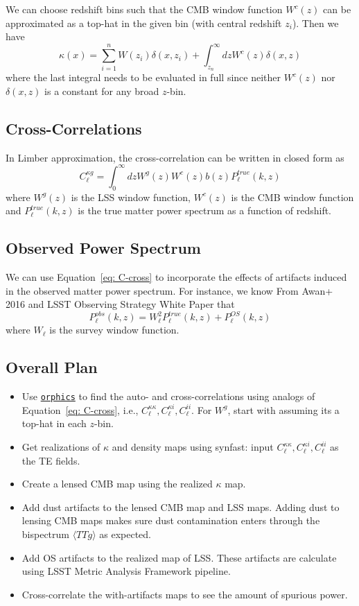 \documentclass{article}
\newcommand{\eq}[1]{\begin{equation}{#1}\end{equation}}
\begin{document}
{We can choose redshift bins such that the CMB window function $W^c(z)$ can be approximated as a top-hat in the given bin (with central redshift $z_i$). Then we have
\eq{\kappa(x)= \sum_{i=1}^n W(z_i)\delta(x,z_i) +  \int_{z_n}^\infty dz W^c(z)\delta(x,z) \label{eq: kappa break}}
where the last integral needs to be evaluated in full since neither $W^c(z)$ nor $\delta(x,z) $ is a constant for any broad $z$-bin.

\subsection*{Cross-Correlations}
In Limber approximation, the cross-correlation can be written in closed form as
\eq{C_\ell^{\kappa g}= \int_0^\infty dz W^g(z)W^c(z)b(z)P^{true}_\ell(k, z) \label{eq: C-cross}}
where $W^g(z)$ is the LSS window function, $W^c(z)$ is the CMB window function and $P^{true}_\ell(k, z)$ is the true matter power spectrum as a function of redshift.

\subsection*{Observed Power Spectrum}
We can use Equation~\ref{eq: C-cross} to incorporate the effects of artifacts induced in the observed matter power spectrum. For instance, we know From Awan+ 2016 and LSST Observing Strategy White Paper that
\eq{P^{obs}_\ell(k, z)= W_\ell^2 P^{true}_\ell(k, z) + P^{OS}_\ell(k, z) \label{eq: Pobs}}
where $W_\ell$ is the survey window function.

\subsection*{Overall Plan}
\begin{itemize}
\item Use \href{https://github.com/msyriac/orphics/blob/1153f3e6b634b780cb7676444b7312df4b2ea7f6/orphics/theory/cosmology.py}{\texttt{orphics}} to find the auto- and cross-correlations using analogs of Equation~\ref{eq: C-cross}, i.e., $C_\ell^{\kappa\kappa}, C_\ell^{\kappa i}, C_\ell^{ii}$. For $W^g$, start with assuming its a top-hat in each $z$-bin.
\item Get realizations of $\kappa$ and density maps using synfast: input $C_\ell^{\kappa\kappa}, C_\ell^{\kappa i}, C_\ell^{ii}$ as the TE fields.
\item Create a lensed CMB map using the realized $\kappa$ map.
\item Add dust artifacts to the lensed CMB map and LSS maps. Adding dust to lensing CMB maps makes sure dust contamination enters through the bispectrum $\langle TTg \rangle$ as expected.
\item Add OS artifacts to the realized map of LSS. These artifacts are calculate using LSST Metric Analysis Framework pipeline.
\item Cross-correlate the with-artifacts maps to see the amount of spurious power.
\end{itemize}


}
\end{document}
